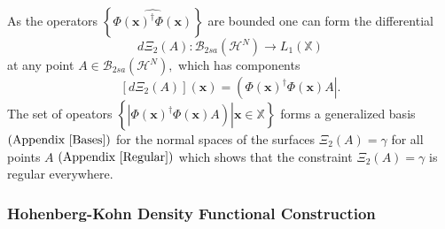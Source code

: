 \documentclass[aps,preprint]{revtex4}%
\begin{document}
As the operators $\left\{  \widehat{\Phi\left(  \boldsymbol{x}\right)
^{\dagger}\Phi\left(  \boldsymbol{x}\right)  }\right\}  $ are bounded one can
form the differential
\begin{equation}
d\Xi_{2}\left(  A\right)  :\mathcal{B}_{2sa}\left(  \mathcal{H}^{N}\right)
\rightarrow L_{1}\left(  \mathbb{X}\right)
\end{equation}
at any point $A\in\mathcal{B}_{2sa}\left(  \mathcal{H}^{N}\right)  ,$ which
has components
\begin{equation}
\left[  d\Xi_{2}\left(  A\right)  \right]  \left(  \boldsymbol{x}\right)
=\left(  \Phi\left(  \boldsymbol{x}\right)  ^{\dagger}\Phi\left(
\boldsymbol{x}\right)  A\right\vert .
\end{equation}
The set of opeators $\left\{  \left.  \left\vert \Phi\left(  \boldsymbol{x}%
\right)  ^{\dagger}\Phi\left(  \boldsymbol{x}\right)  A\right)  \right\vert
\boldsymbol{x\in}\mathbb{X}\right\}  $ forms a generalized basis $\left(
\text{Appendix \ref{Bases}}\right)  $ for the normal spaces of the surfaces
$\Xi_{2}\left(  A\right)  =\gamma$ for all points $A$ $\left(  \text{Appendix
\ref{Regular}}\right)  $ which shows that the constraint $\Xi_{2}\left(
A\right)  =\gamma$ is regular everywhere.

\subsubsection{Hohenberg-Kohn Density Functional Construction}
\end{document}

